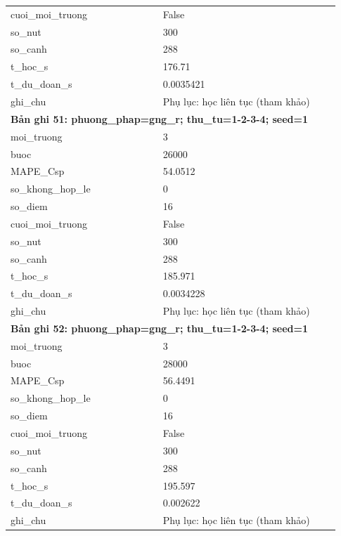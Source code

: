 \begin{longtable}{p{0.43\linewidth}p{0.50\linewidth}}
cuoi\_\allowbreak moi\_\allowbreak truong & False \\
so\_\allowbreak nut & 300 \\
so\_\allowbreak canh & 288 \\
t\_\allowbreak hoc\_\allowbreak s & 176.71 \\
t\_\allowbreak du\_\allowbreak doan\_\allowbreak s & 0.0035421 \\
ghi\_\allowbreak chu & Phụ lục: học liên tục (tham khảo) \\
\midrule
\multicolumn{2}{p{0.95\linewidth}}{\textbf{Bản ghi 51: phuong\_phap=gng\_r; thu\_tu=1-2-3-4; seed=1}} \\
moi\_\allowbreak truong & 3 \\
buoc & 26000 \\
MAPE\_\allowbreak Csp & 54.0512 \\
so\_\allowbreak khong\_\allowbreak hop\_\allowbreak le & 0 \\
so\_\allowbreak diem & 16 \\
cuoi\_\allowbreak moi\_\allowbreak truong & False \\
so\_\allowbreak nut & 300 \\
so\_\allowbreak canh & 288 \\
t\_\allowbreak hoc\_\allowbreak s & 185.971 \\
t\_\allowbreak du\_\allowbreak doan\_\allowbreak s & 0.0034228 \\
ghi\_\allowbreak chu & Phụ lục: học liên tục (tham khảo) \\
\midrule
\multicolumn{2}{p{0.95\linewidth}}{\textbf{Bản ghi 52: phuong\_phap=gng\_r; thu\_tu=1-2-3-4; seed=1}} \\
moi\_\allowbreak truong & 3 \\
buoc & 28000 \\
MAPE\_\allowbreak Csp & 56.4491 \\
so\_\allowbreak khong\_\allowbreak hop\_\allowbreak le & 0 \\
so\_\allowbreak diem & 16 \\
cuoi\_\allowbreak moi\_\allowbreak truong & False \\
so\_\allowbreak nut & 300 \\
so\_\allowbreak canh & 288 \\
t\_\allowbreak hoc\_\allowbreak s & 195.597 \\
t\_\allowbreak du\_\allowbreak doan\_\allowbreak s & 0.002622 \\
ghi\_\allowbreak chu & Phụ lục: học liên tục (tham khảo) \\

\end{longtable}
